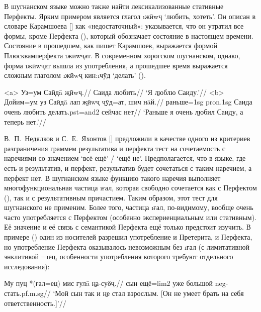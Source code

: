 {{{В шугнанском языке можно также найти лексикализованные стативные Перфекты. Ярким примером является глагол \i{жӣwҷ} ‘любить, хотеть’. Он описан в словаре Карамшоева [\cite*{karamshoev1988}] как «недостаточный»: указывается, что он утратил все формы, кроме Перфекта (), который обозначает состояние в настоящем времени. Состояние в прошедшем, как пишет Карамшоев, выражается формой Плюсквамперфекта \i{жӣwҷат}. В современном хорогском шугнанском, однако, форма \i{жӣwҷат} вышла из употребления, а прошедшее время выражается сложным глаголом \i{жӣwҷ кин}:\i{чӯд} ‘делать’ ().

\a<a> \begingl
\gla Уз=ум Саӣдā \b{жӣwҷ}.//
 Саида любить//
\glft ‘Я \b{люблю} Саиду.’//
\endgl
\a<b> \begingl
\gla Дойим=ум уз Саӣдā лап \b{жӣwҷ} \b{чӯд}=ат, шич нāй.//
\glc раньше={\sc 1sg} {\sc pron.1sg} Саида очень любить делать.{\sc pst=and2} сейчас нет//
\glft ‘Раньше я очень \b{любил} Саиду, а теперь нет.’//
\endgl \xe

В.~П.~Недялков и С.~Е.~Яхонтов [\cite*[12]{nedialkov_yakhontov1983}] предложили в качестве одного из критериев разграничения граммем результатива и перфекта тест на сочетаемость с наречиями со значением ‘всё ещё’ / ‘ещё не’. Предполагается, что в языке, где есть и результатив, и перфект, результатив будет сочетаться с таким наречием, а перфект нет. В шугнанском языке функцию такого наречия выполняет многофункциональная частица \i{ғал}, которая свободно сочетается как с Перфектом (), так и с результативным причастием. Таким образом, этот тест для шугнанского не применим. Более того, частица \i{ғал}, по-видимому, вообще очень часто употребляется с Перфектом (особенно экспериенциальным или стативным). Её значение и её связь с семантикой Перфекта ещё только предстоит изучить. В примере () один из носителей разрешил употребление и Претерита, и Перфекта, но употребление Перфекта оказывалось невозможным без \i{ғал} (с лимитативной энклитикой =\i{ец}, особенности употребления которого требуют отдельного исследования):

\begingl
\gla Му пуц *(ғал=ец) мис ғулā \b{на-суδҷ}.//
 сын ещё={\sc lim2} уже большой {\sc neg}-стать.{\sc pf.m.sg}//
\glft ‘Мой сын так и \b{не стал} взрослым. [Он не умеет брать на себя ответственность.]’//
\endgl \xe

}}}
